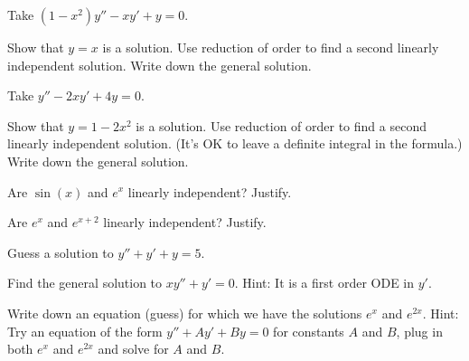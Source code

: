 \begin{exercise}
Take 
$(1-x^2)y''-xy' + y = 0$.
\begin{tasks}
\task Show that $y=x$ is a solution.
\task Use reduction of order to find a second linearly independent solution.
\task Write down the general solution.
\end{tasks}
\end{exercise}

\begin{exercise}
Take 
$y''-2xy' + 4y = 0$.
\begin{tasks}
\task Show that $y=1-2x^2$ is a solution.  
\task Use reduction of order to find a second linearly independent solution.
(It's OK to leave a definite integral in the formula.)
\task Write down the general solution.
\end{tasks}
\end{exercise}

\setcounter{exercise}{100}

\begin{exercise}
Are $\sin(x)$ and $e^x$ linearly independent?  Justify.
\end{exercise}

\begin{exercise}
Are $e^x$ and $e^{x+2}$ linearly independent?  Justify.
\end{exercise}

\begin{exercise}
Guess a solution to $y'' + y' + y= 5$.
\end{exercise}

\begin{exercise}
Find the general solution to
$x y'' + y' = 0$.  Hint: It is a first order ODE in $y'$.
\end{exercise}

\begin{exercise}
Write down an equation (guess) for which we have the solutions
$e^x$ and $e^{2x}$.  Hint: Try an equation of the form
$y''+Ay'+By = 0$ for constants $A$ and $B$,
plug in both $e^x$ and $e^{2x}$ and solve for $A$ and $B$.
\end{exercise}



